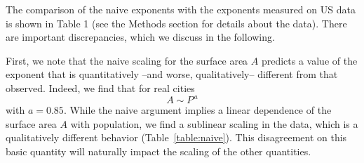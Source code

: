 The comparison of the naive exponents with the exponents measured on US data is shown in Table 1 (see the Methods section for details about the data). There are important discrepancies, which we discuss in the following.

First, we note that the naive scaling for the surface area $A$ predicts a value of the exponent that is quantitatively --and worse, qualitatively-- different from that observed. Indeed, we find that for real cities
%
\begin{equation}
A \sim P^{\,a}
\end{equation}
%
with $a=0.85$. While the naive argument implies a linear dependence of the surface area $A$ with population, we find a sublinear scaling in the data, which is a qualitatively different behavior (Table~\ref{table:naive}). This disagreement on this basic quantity will naturally impact the scaling of the other quantities.


